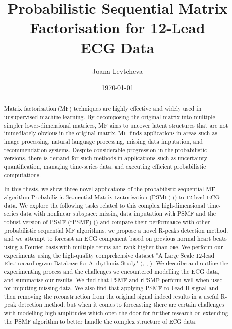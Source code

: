 \documentclass{mldsmsc}
\title{Probabilistic Sequential Matrix Factorisation for 12-Lead \\ ECG Data}
\author{Joana Levtcheva}
\date{\today}
\begin{document}
\maketitle


\declarationdate{\today}
\declaration 

\begin{abstract}

Matrix factorisation (MF) techniques are highly effective and widely used in unsupervised machine learning. By decomposing the original matrix into multiple simpler lower-dimensional matrices, MF aims to uncover latent structures that are not immediately obvious in the original matrix. MF finds applications in areas such as image processing, natural language processing, missing data imputation, and recommendation systems. Despite considerable progression in the probabilistic versions, there is demand for such methods in applications such as uncertainty quantification, managing time-series data, and executing efficient probabilistic computations. \newline

\noindent In this thesis, we show three novel applications of the probabilistic sequential MF algorithm Probabilistic Sequential Matrix Factorisation (PSMF) (\cite{akyildiz2021probabilistic}) to 12-lead ECG data. We explore the following tasks related to this complex high-dimensional time-series data with nonlinear subspace: missing data imputation with PSMF and the robust version of PSMF (rPSMF) (\cite{akyildiz2021probabilistic}) and compare their performance with other probabilistic sequential MF algorithms, we propose a novel R-peaks detection method, and we attempt to forecast an ECG component based on previous normal heart beats using a Fourier basis with multiple terms and rank higher than one. We perform our experiments using the high-quality comprehensive dataset "A Large Scale 12-lead Electrocardiogram Database for Arrhythmia Study" (\cite{cite1}, \cite{cite2}, \cite{cite3}). We describe and outline the experimenting process and the challenges we encountered modelling the ECG data, and summarise our results. We find that PSMF and rPSMF perform well when used for imputing missing data. We also find that applying PSMF to Lead II signal and then removing the  reconstruction from the original signal indeed results in a useful R-peak detection method, but when it comes to forecasting there are certain challenges with modelling high amplitudes which open the door for further research on extending the PSMF algorithm to better handle the complex structure of ECG data. \newline

\end{abstract}
\end{document}
